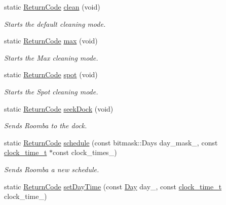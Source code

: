\begin{DoxyCompactItemize}
static \hyperlink{namespaceroomba_aff53babe0af88b1ea8b066fd18b8f23f}{Return\+Code} \hyperlink{classroomba_1_1_open_interface_a72a0f8329c0e57f1a7822e3ab3260878}{clean} (void)
\begin{DoxyCompactList}\small\item\em Starts the default cleaning mode. \end{DoxyCompactList}\item 
static \hyperlink{namespaceroomba_aff53babe0af88b1ea8b066fd18b8f23f}{Return\+Code} \hyperlink{classroomba_1_1_open_interface_a15feaa543a8dbe11b977cc6ec306cdc6}{max} (void)
\begin{DoxyCompactList}\small\item\em Starts the Max cleaning mode. \end{DoxyCompactList}\item 
static \hyperlink{namespaceroomba_aff53babe0af88b1ea8b066fd18b8f23f}{Return\+Code} \hyperlink{classroomba_1_1_open_interface_aabcb782c233920f3c33b450fa8d7f228}{spot} (void)
\begin{DoxyCompactList}\small\item\em Starts the Spot cleaning mode. \end{DoxyCompactList}\item 
static \hyperlink{namespaceroomba_aff53babe0af88b1ea8b066fd18b8f23f}{Return\+Code} \hyperlink{classroomba_1_1_open_interface_af6addab54a2f577fa2e82b0d27bff222}{seek\+Dock} (void)
\begin{DoxyCompactList}\small\item\em Sends Roomba to the dock. \end{DoxyCompactList}\item 
static \hyperlink{namespaceroomba_aff53babe0af88b1ea8b066fd18b8f23f}{Return\+Code} \hyperlink{classroomba_1_1_open_interface_af5f39d5f3086ee8a9bd6a6b49ab2e00f}{schedule} (const bitmask\+::\+Days day\+\_\+mask\+\_\+, const \hyperlink{structroomba_1_1clock__time__t}{clock\+\_\+time\+\_\+t} $\ast$const clock\+\_\+times\+\_\+)
\begin{DoxyCompactList}\small\item\em Sends Roomba a new schedule. \end{DoxyCompactList}\item 
static \hyperlink{namespaceroomba_aff53babe0af88b1ea8b066fd18b8f23f}{Return\+Code} \hyperlink{classroomba_1_1_open_interface_a1d7d2da008ee7523249876e456ac9dff}{set\+Day\+Time} (const \hyperlink{namespaceroomba_a30df4953fe65b5b801c82a16865e50e1}{Day} day\+\_\+, const \hyperlink{structroomba_1_1clock__time__t}{clock\+\_\+time\+\_\+t} clock\+\_\+time\+\_\+)

\end{DoxyCompactItemize}
